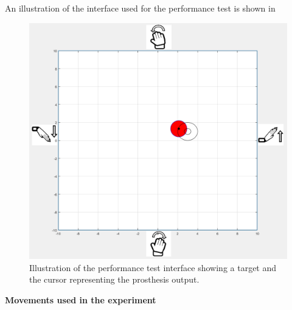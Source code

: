 An illustration of the interface used for the performance test is shown in 

\begin{figure}[H]                 
	\includegraphics[width=.6\textwidth]{figures/xBackground/perftestGUI}  
	\caption{Illustration of the performance test interface showing a target and the cursor representing the prosthesis output.}
	\label{fig:perftestGUI} 
\end{figure}

\textbf{Movements used in the experiment}

